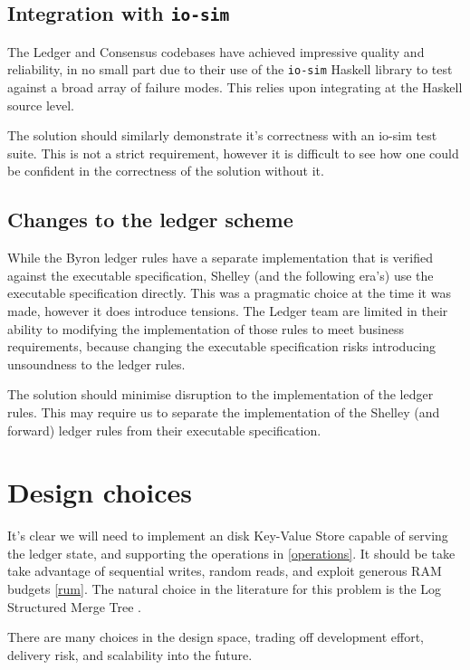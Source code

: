 \documentclass[11pt,a4paper]{article}
\begin{document}
\subsection{Integration with {\tt io-sim}}
\label{io-sim}
The Ledger and Consensus codebases have achieved impressive quality
and reliability, in no small part due to their use of the {\tt io-sim}
Haskell library to test against a broad array of failure modes. This
relies upon integrating at the Haskell source level.

The solution should similarly demonstrate it's correctness with an io-sim test
suite. This is not a strict requirement, however it is difficult to see how one
could be confident in the correctness of the solution without it.

\subsection{Changes to the ledger scheme}

While the Byron ledger rules have
a separate implementation that is verified against the executable specification,
Shelley (and the following era's) use the executable specification directly.
This was a pragmatic choice at the time it was made, however it does introduce
tensions. The Ledger team are limited in their ability to modifying the
implementation of those rules to meet business requirements, because changing
the executable specification risks introducing unsoundness to the ledger rules.

The solution should minimise disruption to the implementation of the ledger
rules. This may require us to separate the implementation of the Shelley (and
forward) ledger rules from their executable specification.

\section{Design choices}
\label{options}

It's clear we will need to implement an disk Key-Value Store capable of serving
the ledger state, and supporting the operations in \ref{operations}. It should
be take take advantage of sequential writes, random reads, and exploit generous
RAM budgets \ref{rum}. The natural choice in the literature for this problem is
the Log Structured Merge Tree .

There are many choices in the design space, trading off development effort,
delivery risk, and scalability into the future.
\end{document}
